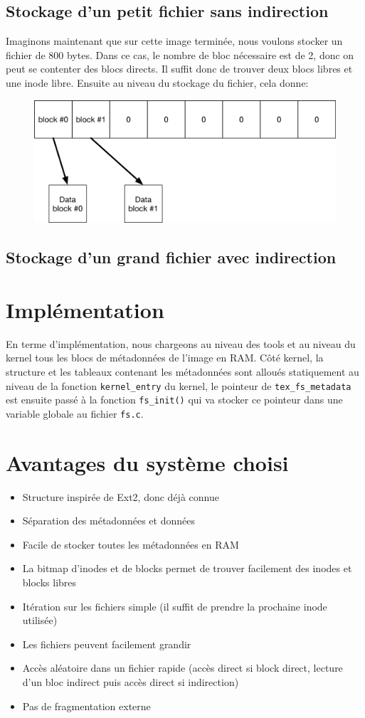 \documentclass{article}
\begin{document}
\subsection{Stockage d'un petit fichier sans indirection}
Imaginons maintenant que sur cette image terminée, nous voulons stocker un fichier de 800 bytes. Dans ce cas, le nombre de bloc nécessaire est de 2, donc on peut se contenter des blocs directs. Il suffit donc de trouver deux blocs libres et une inode libre. Ensuite au niveau du stockage du fichier, cela donne:
\begin{figure}[H]
    \centering
    \includegraphics[width=\textwidth]{FS_petit_fichier.png}
\end{figure}
\subsection{Stockage d'un grand fichier avec indirection}
\section{Implémentation}
En terme d'implémentation, nous chargeons au niveau des tools et au niveau du kernel tous les blocs de métadonnées de l'image en RAM. Côté kernel, la structure et les tableaux contenant les métadonnées sont alloués statiquement au niveau de la fonction \verb+kernel_entry+ du kernel, le pointeur de \verb+tex_fs_metadata+ est ensuite passé à la fonction \verb+fs_init()+ qui va stocker ce pointeur dans une variable globale au fichier \verb+fs.c+.
\section{Avantages du système choisi}
\begin{itemize}
	\item Structure inspirée de Ext2, donc déjà connue
	\item Séparation des métadonnées et données
	\item Facile de stocker toutes les métadonnées en RAM
	\item La bitmap d'inodes et de blocks permet de trouver facilement des inodes et blocks libres
	\item Itération sur les fichiers simple (il suffit de prendre la prochaine inode utilisée)
	\item Les fichiers peuvent facilement grandir
	\item Accès aléatoire dans un fichier rapide (accès direct si block direct, lecture d'un bloc indirect puis accès direct si indirection)
	\item Pas de fragmentation externe
\end{itemize}
\end{document}

